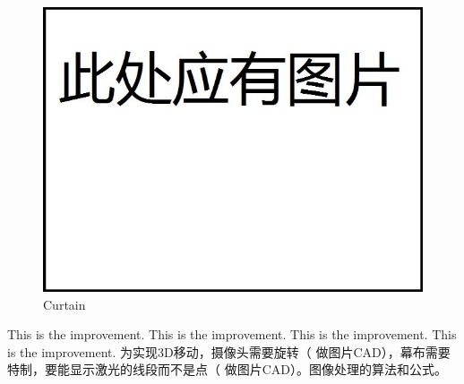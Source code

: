 \documentclass[12pt]{article}
\begin{document}
\begin{flushleft}
\begin{figure}[ht!]
	\begin{center}
		\includegraphics[scale = 0.6]{curtain.jpg}
		\caption{Curtain}
	\end{center}
\end{figure}
This is the improvement. This is the improvement. This is the improvement. This is the improvement. 
为实现3D移动，摄像头需要旋转（ 做图片CAD），幕布需要特制，要能显示激光的线段而不是点（ 做图片CAD）。图像处理的算法和公式。


\end{flushleft}
\end{document}
